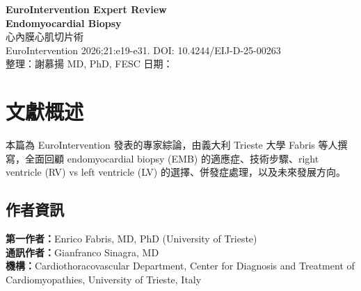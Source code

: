 \documentclass[12pt,a4paper]{article}
\begin{document}
\begin{center}
{\LARGE\bfseries\textcolor{emergency_red}{EuroIntervention Expert Review}}\\[0.5cm]
{\Large\textbf{Endomyocardial Biopsy}}\\[0.3cm]
{\large 心內膜心肌切片術}\\[0.5cm]
{\normalsize EuroIntervention 2026;21:e19-e31. DOI: 10.4244/EIJ-D-25-00263}\\[0.3cm]
{\normalsize 整理：謝慕揚 MD, PhD, FESC \quad 日期：\mydate}
\end{center}


\tableofcontents
\newpage

\section{文獻概述}

本篇為 EuroIntervention 發表的專家綜論，由義大利 Trieste 大學 Fabris 等人撰寫，全面回顧 endomyocardial biopsy (EMB) 的適應症、技術步驟、right ventricle (RV) vs left ventricle (LV) 的選擇、併發症處理，以及未來發展方向。

\subsection{作者資訊}
\textbf{第一作者：}Enrico Fabris, MD, PhD (University of Trieste)\\
\textbf{通訊作者：}Gianfranco Sinagra, MD\\
\textbf{機構：}Cardiothoracovascular Department, Center for Diagnosis and Treatment of Cardiomyopathies, University of Trieste, Italy
\end{document}
